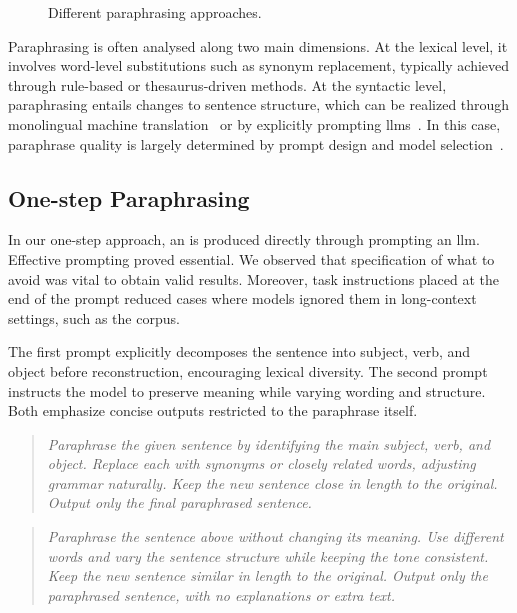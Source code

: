 \begin{figure}[h]
    \centering
    
    \caption{Different paraphrasing approaches.}
    \label{fig:paraphrasing_approaches}
\end{figure}


Paraphrasing is often analysed along two main dimensions. 
At the lexical level, it involves word-level substitutions such as synonym replacement, typically achieved through rule-based or thesaurus-driven methods. 
At the syntactic level, paraphrasing entails changes to sentence structure, which can be realized through monolingual machine translation~\citep{zhou_paraphrase_2021} or by explicitly prompting \acp{llm}~\citep{kurt_pehlivanoglu_comparative_2024}.
In this case, paraphrase quality is largely determined by prompt design and model selection~\citep{Wu_ODD_challenges_2025}.


\subsection{One-step Paraphrasing}

In our one-step approach, an \imp{} is produced directly through prompting an \ac{llm}. 
Effective prompting proved essential.
We observed that specification of what to avoid was vital to obtain valid results. 
Moreover, task instructions placed at the end of the prompt reduced cases where models ignored them in long-context settings, such as the \dataGutenberg{} corpus.

The first prompt explicitly decomposes the sentence into subject, verb, and object before reconstruction, encouraging lexical diversity. 
The second prompt instructs the model to preserve meaning while varying wording and structure. 
Both emphasize concise outputs restricted to the paraphrase itself.

\begin{quote}
    \textit{Paraphrase the given sentence by identifying the main subject, verb, and object. Replace each with synonyms or closely related words, adjusting grammar naturally. Keep the new sentence close in length to the original. Output only the final paraphrased sentence.}
\end{quote}

\begin{quote}
    \textit{Paraphrase the sentence above without changing its meaning. Use different words and vary the sentence structure while keeping the tone consistent. Keep the new sentence similar in length to the original. Output only the paraphrased sentence, with no explanations or extra text.}
\end{quote}

